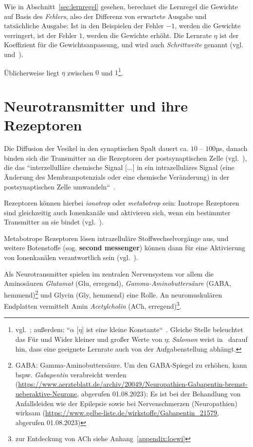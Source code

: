 Wie in Abschnitt~\ref{sec:lernregel} gesehen, berechnet die Lernregel die Gewichte auf Basis des \textit{Fehlers}, also der Differenz von $\text{erwartete Ausgabe}$ und $\text{tatsächliche Ausgabe}$: Ist in den Beispielen der Fehler $-1$, werden die Gewichte verringert, ist der Fehler $1$, werden die Gewichte erhöht.
Die Lernrate $\eta$ ist der Koeffizient für die Gewichtsanpassung, und wird auch \textit{Schrittweite} genannt (vgl.~\cite[93]{GBC18} und~\cite[172]{RN09}).

Üblicherweise liegt $\eta$ zwischen $0$ und $1$\footnote{
    vgl.~\cite[61]{Fau94}; außerdem: ``$\alpha$ [$\eta$] ist eine kleine Konstante``~\cite[172]{RN09}. Gleiche Stelle beleuchtet das Für und Wider kleiner und großer Werte von $\eta$; \textit{Salomon} weist in~\cite[173]{Sal90} darauf hin, dass eine geeignete Lernrate auch von der Aufgabenstellung abhängt.
}.



\section{Neurotransmitter und ihre Rezeptoren}\label{appendix:neurotransmitter}

Die Diffusion der Vesikel in den synaptischen Spalt dauert ca. $10$ – $100$µs, danach binden sich die Transmitter an die Rezeptoren der postsynaptischen Zelle (vgl.~\cite[96]{HS19a}), die das ``interzellulläre chemische Signal [...] in ein intrazelluläres Signal (eine Änderung des Membranpotenzials oder eine chemische Veränderung) in der postsynaptischen Zelle umwandeln``~\cite[123]{BCP18}.

Rezeptoren können hierbei \textit{ionotrop} oder \textit{metabotrop} sein: Inotrope Rezeptoren sind gleichzeitig auch Ionenkanäle und aktivieren sich, wenn ein bestimmter Transmitter an sie bindet (vgl.~\cite[109]{HS19b}).

Metabotrope Rezeptoren lösen intrazelluläre Stoffwechselvorgänge aus, und weitere Botenstoffe (sog. \textbf{second messenger}) können dann für eine Aktivierung von Ionenkanälen verantwortlich sein (vgl.~\cite[134]{RK18}).

Als Neurotransmitter spielen im zentralen Nervensystem vor allem die Aminosäuren \textit{Glutamat} (Glu, erregend), \textit{Gamma-Aminobuttersäure} (GABA, hemmend)\footnote{
    GABA: Gamma-Aminobuttersäure. Um den GABA-Spiegel zu erhöhen, kann bspw. \textit{Gabapentin} verabreicht werden (\url{https://www.aerzteblatt.de/archiv/20049/Neuropathien-Gabapentin-bremst-ueberaktive-Neurone}, abgerufen 01.08.2023): Es ist bei der Behandlung von Anfallsleiden wie der Epilepsie sowie bei Nervenschmerzen (Neuropathien) wirksam (\url{https://www.gelbe-liste.de/wirkstoffe/Gabapentin_21579}, abgerufen 01.08.2023)
} und Glycin (Gly, hemmend) eine Rolle. An neuromuskulären Endplatten vermittelt Amin \textit{Acetylcholin} (ACh, erregend)\footnote{zur Entdeckung von ACh siehe Anhang~\ref{appendix:loewi}}.

